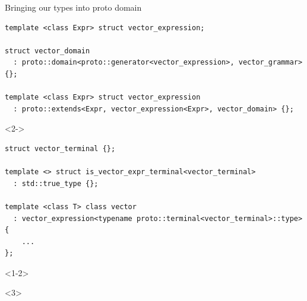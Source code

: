 \documentclass[@BEAMER_OPTIONS@]{beamer}
\begin{document}
\begin{frame}[fragile]{Bringing our types into proto domain}
    \begin{exampleblock}{}
        \begin{lstlisting}
template <class Expr> struct vector_expression;

struct vector_domain
  : proto::domain<proto::generator<vector_expression>, vector_grammar> {};

template <class Expr> struct vector_expression
  : proto::extends<Expr, vector_expression<Expr>, vector_domain> {};
        \end{lstlisting}
    \end{exampleblock}
    \begin{exampleblock}<2->{}
        \begin{lstlisting}
struct vector_terminal {};

template <> struct is_vector_expr_terminal<vector_terminal>
  : std::true_type {};

template <class T> class vector
  : vector_expression<typename proto::terminal<vector_terminal>::type>
{
    ...
};
        \end{lstlisting}
    \end{exampleblock}
    \begin{onlyenv}<1-2>
    \end{onlyenv}
    \begin{onlyenv}<3>
    \end{onlyenv}
\end{frame}
\end{document}
